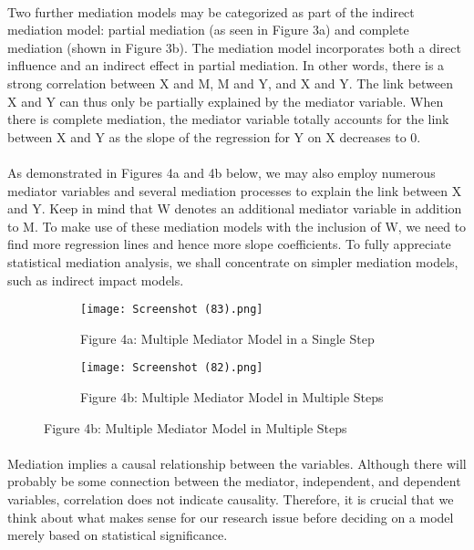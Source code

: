 \documentclass[12pt]{report}
\begin{document}
\paragraph{}
Two further mediation models may be categorized as part of the indirect mediation model: partial mediation (as seen in Figure 3a) and complete mediation (shown in Figure 3b). The mediation model incorporates both a direct influence and an indirect effect in partial mediation. In other words, there is a strong correlation between X and M, M and Y, and X and Y. The link between X and Y can thus only be partially explained by the mediator variable. When there is complete mediation, the mediator variable totally accounts for the link between X and Y as the slope of the regression for Y on X decreases to 0.

\paragraph{}
As demonstrated in Figures 4a and 4b below, we may also employ numerous mediator variables and several mediation processes to explain the link between X and Y. Keep in mind that W denotes an additional mediator variable in addition to M. To make use of these mediation models with the inclusion of W, we need to find more regression lines and hence more slope coefficients. To fully appreciate statistical mediation analysis, we shall concentrate on simpler mediation models, such as indirect impact models.

\begin{figure}[H]
  \begin{subfigure}[b]{0.4\textwidth}
     \texttt{[image: Screenshot (83).png]}
    \caption{Figure 4a: Multiple Mediator Model in a Single Step}
  \end{subfigure}
  \hfill
  \begin{subfigure}[b]{0.5\textwidth}
    \texttt{[image: Screenshot (82).png]}
    \caption{Figure 4b: Multiple Mediator Model in Multiple Steps}
  \end{subfigure}
  \label{fig:Figure 4}
\end{figure}

\paragraph{}
Mediation implies a causal relationship between the variables. Although there will probably be some connection between the mediator, independent, and dependent variables, correlation does not indicate causality. Therefore, it is crucial that we think about what makes sense for our research issue before deciding on a model merely based on statistical significance.
\end{document}
